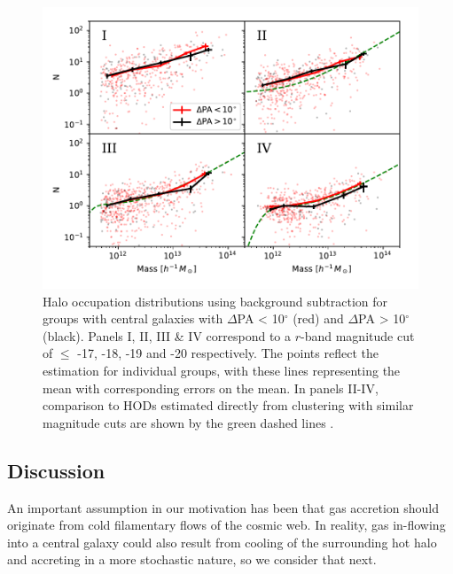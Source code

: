\begin{figure}
	\includegraphics[width=\linewidth]{thesis/latex/halo_assembly_manga/hod_vs_zehavi.pdf}
    \caption[Halo occupation distributions using background subtraction for groups with central galaxies split on $\Delta$PA.]{Halo occupation distributions using background subtraction for groups with central galaxies with $\Delta$PA < 10$^{\circ}$ (red) and $\Delta$PA > 10$^{\circ}$ (black). Panels I, II, III \& IV correspond to a $r$-band magnitude cut of $\leq$ -17, -18, -19 and -20 respectively. The points reflect the estimation for individual groups, with these lines representing the mean with corresponding errors on the mean. In panels II-IV, comparison to HODs estimated directly from clustering with similar magnitude cuts are shown by the green dashed lines \citep[][see text]{zehavi2011}.}
    \label{fig:hod_mpl6}
\end{figure}

\subsection{Discussion}
An important assumption in our motivation has been that gas accretion should originate from cold filamentary flows of the cosmic web. In reality, gas in-flowing into a central galaxy could also result from cooling of the surrounding hot halo and accreting in a more stochastic nature, so we consider that next. 

